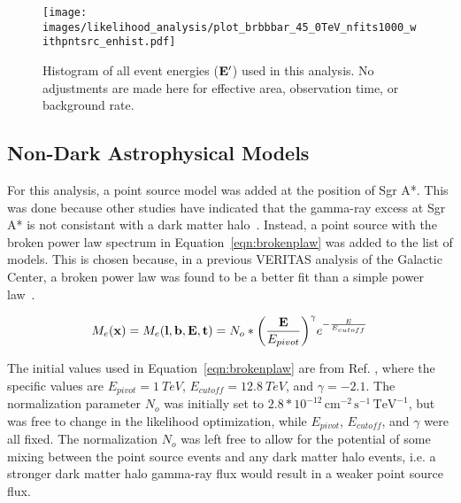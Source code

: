   \begin{figure}[!ht]
    \centering
    \texttt{[image: images/likelihood\_analysis/plot\_brbbbar\_45\_0TeV\_nfits1000\_withpntsrc\_enhist.pdf]}
    \caption[Galactic Center Counts Energy Histogram]{
      Histogram of all event energies ($\mathbf{E'}$) used in this analysis.
      No adjustments are made here for effective area, observation time, or background rate.
    }
    \label{fig:gc_counts_enhist}
  \end{figure}

  \FloatBarrier

  \subsection{Non-Dark Astrophysical Models}\label{subsec:gcpointsrc}
  For this analysis, a point source model was added at the position of Sgr A*.
  This was done because other studies have indicated that the gamma-ray excess at Sgr A* is not consistant with a dark matter halo~\cite{gc_pnt_is_not_dm1, gc_pnt_is_not_dm2, gc_pnt_is_not_dm3}.
  Instead, a point source with the broken power law spectrum in Equation~\ref{eqn:brokenplaw} was added to the list of models.
  This is chosen because, in a previous VERITAS analysis of the Galactic Center, a broken power law was found to be a better fit than a simple power law~\cite{VeritasGCRidge2015}.
  
  \begin{equation}\label{eqn:brokenplaw}
    M_e(\mathbf{x }) = M_e(\mathbf{l },\mathbf{b },\mathbf{E },\mathbf{t }) = N_o * { \left ( \frac{\mathbf{E }}{E_{pivot}} \right ) }^{\gamma} {e}^{-\frac{E}{E_{cutoff}}}
  \end{equation}
  
  The initial values used in Equation~\ref{eqn:brokenplaw} are from Ref. \cite{VeritasGCRidge2015}, where the specific values are $E_{pivot}=\SI{1}{TeV}$, $E_{cutoff}=\SI{12.8}{TeV}$, and $\gamma=-2.1$.
  The normalization parameter $N_o$ was initially set to $2.8*{10}^{-12}\,\text{cm}^{-2}\,\text{s}^{-1}\,\text{TeV}^{-1}$, but was free to change in the likelihood optimization, while $E_{pivot}$, $E_{cutoff}$, and $\gamma$ were all fixed.
  The normalization $N_o$ was left free to allow for the potential of some mixing between the point source events and any dark matter halo events, i.e. a stronger dark matter halo gamma-ray flux would result in a weaker point source flux.
  
